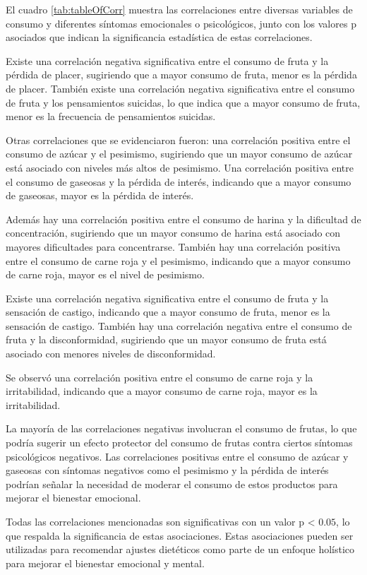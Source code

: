 \documentclass[stu, 12pt]{apa7}
\begin{document}
	El cuadro \ref{tab:tableOfCorr} muestra las correlaciones entre diversas variables de consumo y
	diferentes síntomas emocionales o psicológicos, junto con los valores p
	asociados que indican la significancia estadística de estas
	correlaciones.

	Existe una correlación negativa significativa entre el consumo de fruta
	y la pérdida de placer, sugiriendo que a mayor consumo de fruta, menor
	es la pérdida de placer. También existe una correlación negativa
	significativa entre el consumo de fruta y los pensamientos suicidas, lo
	que indica que a mayor consumo de fruta, menor es la frecuencia de
	pensamientos suicidas.

	Otras correlaciones que se evidenciaron fueron: una correlación positiva
	entre el consumo de azúcar y el pesimismo, sugiriendo que un mayor
	consumo de azúcar está asociado con niveles más altos de pesimismo. Una
	correlación positiva entre el consumo de gaseosas y la pérdida de
	interés, indicando que a mayor consumo de gaseosas, mayor es la pérdida
	de interés.

	Además hay una correlación positiva entre el consumo de harina y la
	dificultad de concentración, sugiriendo que un mayor consumo de harina
	está asociado con mayores dificultades para concentrarse. También hay
	una correlación positiva entre el consumo de carne roja y el pesimismo,
	indicando que a mayor consumo de carne roja, mayor es el nivel de
	pesimismo.

	Existe una correlación negativa significativa entre el consumo de fruta
	y la sensación de castigo, indicando que a mayor consumo de fruta, menor
	es la sensación de castigo. También hay una correlación negativa entre
	el consumo de fruta y la disconformidad, sugiriendo que un mayor consumo
	de fruta está asociado con menores niveles de disconformidad.

	Se observó una correlación positiva entre el consumo de carne roja y la
	irritabilidad, indicando que a mayor consumo de carne roja, mayor es la
	irritabilidad.

	La mayoría de las correlaciones negativas involucran el consumo de
	frutas, lo que podría sugerir un efecto protector del consumo de frutas
	contra ciertos síntomas psicológicos negativos. Las correlaciones
	positivas entre el consumo de azúcar y gaseosas con síntomas negativos
	como el pesimismo y la pérdida de interés podrían señalar la necesidad
	de moderar el consumo de estos productos para mejorar el bienestar
	emocional.

	Todas las correlaciones mencionadas son significativas con un valor p
	\textless{} $0.05$, lo que respalda la significancia de estas asociaciones.
	Estas asociaciones pueden ser utilizadas para recomendar ajustes dietéticos
	como parte de un enfoque holístico para mejorar el bienestar emocional y
	mental.
\end{document}
